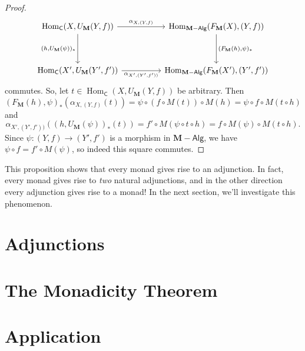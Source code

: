 \documentclass{article}
\theoremstyle{definition}
\newcommand{\C}{\mathsf{C}}
\newcommand{\Alg}{\mathsf{Alg}}
\DeclareMathOperator{\Hom}{Hom}
\begin{document}
\begin{proof}
    \[\begin{tikzcd}[ampersand replacement=\&]
    	{\Hom_{\C}(X,U_{\mathbf{M}}(Y,f))} \&\& {\Hom_{\mathbf{M}{-}\Alg}(F_{\mathbf{M}}(X),(Y,f))} \\
    	\\
    	{\Hom_{\C}(X',U_{\mathbf{M}}(Y',f'))} \&\& {\Hom_{\mathbf{M}{-}\Alg}(F_{\mathbf{M}}(X'),(Y',f'))}
    	\arrow["{\alpha_{X,(Y,f)}}", from=1-1, to=1-3]
    	\arrow["{(h,U_{\mathbf{M}}(\psi))_*}"', from=1-1, to=3-1]
    	\arrow["{\alpha_{X',(Y',f'))}}"', from=3-1, to=3-3]
    	\arrow["{(F_{\mathbf{M}}(h),\psi)_*}", from=1-3, to=3-3]
    \end{tikzcd}\]
    commutes. So, let $t \in {\Hom_{\C}(X,U_{\mathbf{M}}(Y,f))}$ be arbitrary. Then
    \[(F_{\mathbf{M}}(h),\psi)_*(\alpha_{X,(Y,f)}(t)) = \psi \circ (f \circ M(t)) \circ M(h) = \psi \circ f \circ M(t \circ h)\]
    and
    \[\alpha_{X',(Y',f'))}((h,U_{\mathbf{M}}(\psi))_*(t)) = f' \circ M(\psi \circ t \circ h) = f \circ M(\psi) \circ M(t \circ h).\]
    Since $\psi : (Y,f) \to (Y',f')$ is a morphism in $\mathbf{M}{-}\Alg$, we have $\psi \circ f = f' \circ M(\psi)$, so indeed this square commutes.
\end{proof}

This proposition shows that every monad gives rise to an adjunction. In fact, every monad gives rise to \emph{two} natural adjunctions, and in the other direction every adjunction gives rise to a monad! In the next section, we'll investigate this phenomenon.

\section{Adjunctions}

\section{The Monadicity Theorem}

\section{Application}
\end{document}
